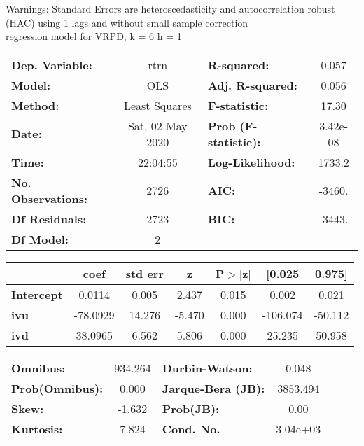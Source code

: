 Warnings: \newline
 [1] Standard Errors are heteroscedasticity and autocorrelation robust (HAC) using 1 lags and without small sample correction\\ 

regression model for VRPD, k = 6 h = 1\begin{center}
\begin{tabular}{lclc}
\toprule
\textbf{Dep. Variable:}    &       rtrn       & \textbf{  R-squared:         } &     0.057   \\
\textbf{Model:}            &       OLS        & \textbf{  Adj. R-squared:    } &     0.056   \\
\textbf{Method:}           &  Least Squares   & \textbf{  F-statistic:       } &     17.30   \\
\textbf{Date:}             & Sat, 02 May 2020 & \textbf{  Prob (F-statistic):} &  3.42e-08   \\
\textbf{Time:}             &     22:04:55     & \textbf{  Log-Likelihood:    } &    1733.2   \\
\textbf{No. Observations:} &        2726      & \textbf{  AIC:               } &    -3460.   \\
\textbf{Df Residuals:}     &        2723      & \textbf{  BIC:               } &    -3443.   \\
\textbf{Df Model:}         &           2      & \textbf{                     } &             \\
\bottomrule
\end{tabular}
\begin{tabular}{lcccccc}
                   & \textbf{coef} & \textbf{std err} & \textbf{z} & \textbf{P$> |$z$|$} & \textbf{[0.025} & \textbf{0.975]}  \\
\midrule
\textbf{Intercept} &       0.0114  &        0.005     &     2.437  &         0.015        &        0.002    &        0.021     \\
\textbf{ivu}       &     -78.0929  &       14.276     &    -5.470  &         0.000        &     -106.074    &      -50.112     \\
\textbf{ivd}       &      38.0965  &        6.562     &     5.806  &         0.000        &       25.235    &       50.958     \\
\bottomrule
\end{tabular}
\begin{tabular}{lclc}
\textbf{Omnibus:}       & 934.264 & \textbf{  Durbin-Watson:     } &    0.048  \\
\textbf{Prob(Omnibus):} &   0.000 & \textbf{  Jarque-Bera (JB):  } & 3853.494  \\
\textbf{Skew:}          &  -1.632 & \textbf{  Prob(JB):          } &     0.00  \\
\textbf{Kurtosis:}      &   7.824 & \textbf{  Cond. No.          } & 3.04e+03  \\
\bottomrule
\end{tabular}
\end{center}

